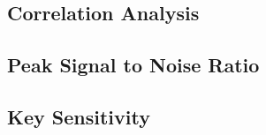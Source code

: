 \documentclass[conference]{IEEEtran}
\begin{document}

\subsection{Correlation Analysis}\label{subsec:correlation-analysis}

\subsection{Peak Signal to Noise Ratio}\label{subsec:peak-signal-to-noise-ratio}

\subsection{Key Sensitivity}\label{subsec:key-sensitivity}

\end{document}
